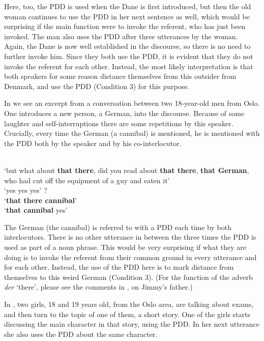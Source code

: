 \documentclass[output=paper,colorlinks,citecolor=brown]{langscibook}
\begin{document}
Here, too, the PDD is used when the Dane is first introduced, but then the old woman continues to use the PDD in her next sentence as well, which would be surprising if the main function were to invoke the referent, who has just been invoked. The man also uses the PDD after three utterances by the woman. Again, the Dane is now well established in the discourse, so there is no need to further invoke him. Since they both use the PDD, it is evident that they do not invoke the referent for each other. Instead, the most likely interpretation is that both speakers for some reason distance themselves from this outsider from Denmark, and use the PDD (Condition 3) for this purpose.

In  we see an excerpt from a conversation between two 18-year-old men from Oslo. One introduces a new person, a German, into the discourse. Because of some laughter and self-interruptions there are some repetitions by this speaker. Crucially, every time the German (a cannibal) is mentioned, he is mentioned with the PDD both by the speaker and by his co-interlocutor. 

\ea\label{ex:johannessen:32}
 \\
\glt ‘but what about \textbf{that there}, did you read about \textbf{that there}, \textbf{that German}, who had cut off the equipment of a guy and eaten it’
\\
\glt ‘yes yes yes’
? \\
\glt ‘\textbf{that there cannibal}’
 \\
\glt ‘\textbf{that cannibal} yes’
\z
\z

The German (the cannibal) is referred to with a PDD each time by both interlocutors. There is no other utterance in between the three times the PDD is used as part of a noun phrase. This would be very surprising if what they are doing is to invoke the referent from their common ground in every utterance and for each other. Instead, the use of the PDD here is to mark distance from themselves to this weird German (Condition 3). (For the function of the adverb \textit{der} ‘there’, please see the comments in , on Jimmy’s father.)

In , two girls, 18 and 19 years old, from the Oslo area, are talking about exams, and then turn to the topic of one of them, a short story. One of the girls starts discussing the main character in that story, using the PDD. In her next utterance she also uses the PDD about the same character.
\end{document}
